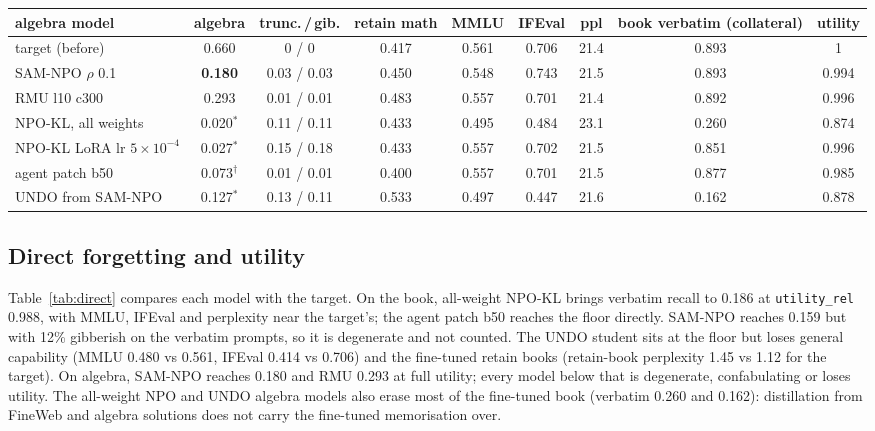 \documentclass[10pt,twocolumn,letterpaper]{article}
\newcommand{\dg}{$^\ast$}
\newcommand{\cf}{$^\dagger$}
\begin{document}
\begin{table}[t]
\vspace{6pt}
\begin{tabular}{@{}lcccccccc@{}}
\toprule
algebra model & algebra & trunc.\,/\,gib. & retain math & MMLU & IFEval & ppl & book verbatim (collateral) & utility \\
\midrule
target (before) & 0.660 & 0 / 0 & 0.417 & 0.561 & 0.706 & 21.4 & 0.893 & 1 \\
\midrule
SAM-NPO $\rho$ 0.1 & \textbf{0.180} & 0.03 / 0.03 & 0.450 & 0.548 & 0.743 & 21.5 & 0.893 & 0.994 \\
RMU l10 c300 & 0.293 & 0.01 / 0.01 & 0.483 & 0.557 & 0.701 & 21.4 & 0.892 & 0.996 \\
NPO-KL, all weights & 0.020\dg & 0.11 / 0.11 & 0.433 & 0.495 & 0.484 & 23.1 & 0.260 & 0.874 \\
NPO-KL LoRA lr $5\times10^{-4}$ & 0.027\dg & 0.15 / 0.18 & 0.433 & 0.557 & 0.702 & 21.5 & 0.851 & 0.996 \\
agent patch b50 & 0.073\cf & 0.01 / 0.01 & 0.400 & 0.557 & 0.701 & 21.5 & 0.877 & 0.985 \\
UNDO from SAM-NPO & 0.127\dg & 0.13 / 0.11 & 0.533 & 0.497 & 0.447 & 21.6 & 0.162 & 0.878 \\
\bottomrule
\end{tabular}
\end{table}

\subsection{Direct forgetting and utility}

Table~\ref{tab:direct} compares each model with the target. On the book, all-weight NPO-KL brings verbatim recall to
0.186 at \texttt{utility\_rel} 0.988, with MMLU, IFEval and perplexity near the target's; the agent patch b50 reaches the
floor directly. SAM-NPO reaches 0.159 but with 12\% gibberish on the verbatim prompts, so it is degenerate and not counted.
The UNDO student sits at the floor but loses general capability (MMLU 0.480 vs 0.561, IFEval 0.414 vs 0.706) and the
fine-tuned retain books (retain-book perplexity 1.45 vs 1.12 for the target). On algebra, SAM-NPO reaches 0.180 and RMU
0.293 at full utility; every model below that is degenerate, confabulating or loses utility. The all-weight NPO and UNDO
algebra models also erase most of the fine-tuned book (verbatim 0.260 and 0.162): distillation from FineWeb and algebra
solutions does not carry the fine-tuned memorisation over.
\end{document}
